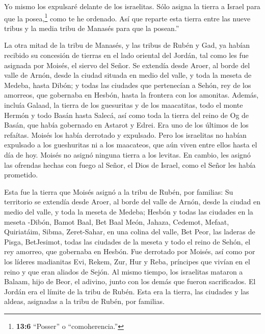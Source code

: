 Yo mismo los expulsaré delante de los israelitas. Sólo asigna la tierra
a Israel para que la posea,\footnote{\textbf{13:6} ``Posser'' o
  ``comoherencia.''} como te he ordenado.  Así que reparte
esta tierra entre las nueve tribus y la media tribu de Manasés para que
la posean.''

 La otra mitad de la tribu de Manasés, y las tribus de Rubén
y Gad, ya habían recibido su concesión de tierras en el lado oriental
del Jordán, tal como les fue asignada por Moisés, el siervo del Señor.
 Se extendía desde Aroer, al borde del valle de Arnón, desde
la ciudad situada en medio del valle, y toda la meseta de Medeba, hasta
Dibón;  y todas las ciudades que pertenecían a Sehón, rey
de los amorreos, que gobernaba en Hesbón, hasta la frontera con los
amonitas.  Además, incluía Galaad, la tierra de los
guesuritas y de los maacatitas, todo el monte Hermón y todo Basán hasta
Salecá,  así como toda la tierra del reino de Og de Basán,
que había gobernado en Astarot y Edrei. Era uno de los últimos de los
refaítas. Moisés los había derrotado y expulsado.  Pero los
israelitas no habían expulsado a los gueshuritas ni a los maacateos, que
aún viven entre ellos hasta el día de hoy.  Moisés no
asignó ninguna tierra a los levitas. En cambio, les asignó las ofrendas
hechas con fuego al Señor, el Dios de Israel, como el Señor les había
prometido.

 Esta fue la tierra que Moisés asignó a la tribu de Rubén,
por familias:  Su territorio se extendía desde Aroer, al
borde del valle de Arnón, desde la ciudad en medio del valle, y toda la
meseta de Medeba;  Hesbón y todas las ciudades en la meseta
-Dibón, Bamot Baal, Bet Baal Meón,  Jahaza, Cedemot,
Mefaat,  Quiriatáim, Sibma, Zeret-Sahar, en una colina del
valle,  Bet Peor, las laderas de Pisga, BetJesimot,
 todas las ciudades de la meseta y todo el reino de Sehón,
el rey amorreo, que gobernaba en Hesbón. Fue derrotado por Moisés, así
como por los líderes madianitas Evi, Rekem, Zur, Hur y Reba, príncipes
que vivían en el reino y que eran aliados de Sejón.  Al
mismo tiempo, los israelitas mataron a Balaam, hijo de Beor, el adivino,
junto con los demás que fueron sacrificados.  El Jordán era
el límite de la tribu de Rubén. Esta era la tierra, las ciudades y las
aldeas, asignadas a la tribu de Rubén, por familias.

